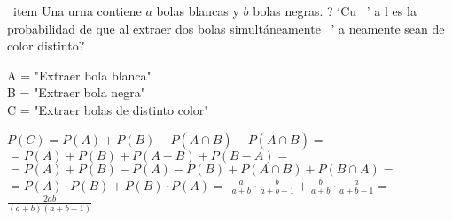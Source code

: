 \problem
\ item   Una urna contiene $ a $ bolas blancas y $ b $ bolas negras. ? `Cu { \ ' a} l es la
probabilidad de que al extraer dos bolas simultáneamente { \ ' a} neamente sean de
color distinto?

\begin{flushleft}
	A = "Extraer bola blanca" \\
B = "Extraer bola negra" \\
C = "Extraer bolas de distinto color"
\end{flushleft}

\begin{flushleft}
	$P(C) = P(A) + P(B)-P(A\cap \bar{B}) -P( \bar{A} \cap B ) =$\\$= P(A) + P(B) + P(A - B) + P(B - A) = $\\
$	= P(A) + P(B) - P(A) - P(B) + P(A\cap B) + P(B\cap A)=$\\
$ 	=P(A) \cdot P(B) + P(B) \cdot P(A) = $
$ \frac{a}{a+b} \cdot \frac{b}{a+b-1} + \frac{b}{a+b} \cdot \frac{a}{a+b-1}= $
$\frac{2ab}{(a+b)(a+b-1)}$
\end{flushleft}
